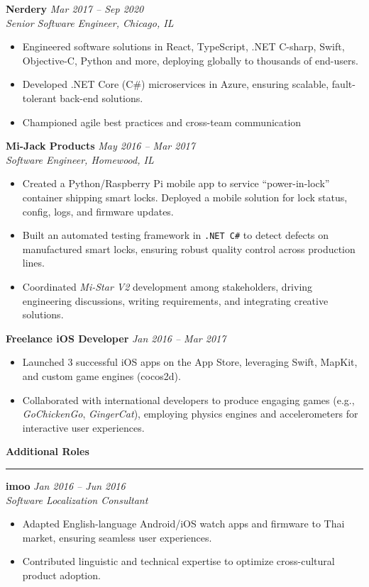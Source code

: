 \documentclass[letterpaper,10pt]{article}
\newcommand{\resheading}[1]{
  \vspace{10pt}
  \textbf{\large #1}
  \vspace{5pt}
  \hrule
  \vspace{5pt}
}
\begin{document}
\textbf{Nerdery} \hfill \textit{Mar 2017 -- Sep 2020}\\
\emph{Senior Software Engineer, Chicago, IL}\\
\begin{itemize}
  \item Engineered software solutions in React, TypeScript, .NET C-sharp, Swift, Objective-C, Python and more, 
        deploying globally to thousands of end-users.
  \item Developed .NET Core (C\#) microservices in Azure, ensuring 
        scalable, fault-tolerant back-end solutions.
  \item Championed agile best practices and cross-team communication
\end{itemize}

\textbf{Mi-Jack Products} \hfill \textit{May 2016 -- Mar 2017}\\
\emph{Software Engineer, Homewood, IL}\\
\begin{itemize}
  \item Created a Python/Raspberry Pi mobile app to service “power-in-lock” 
        container shipping smart locks. Deployed a mobile 
        solution for lock status, config, logs, and firmware updates.
  \item Built an automated testing framework in \texttt{.NET C\#} to detect 
        defects on manufactured smart locks, ensuring robust quality 
        control across production lines.
  \item Coordinated \emph{Mi-Star V2} development among stakeholders, 
        driving engineering discussions, writing requirements, 
        and integrating creative solutions.
\end{itemize}

\textbf{Freelance iOS Developer} \hfill \textit{Jan 2016 -- Mar 2017}\\
\begin{itemize}
  \item Launched 3 successful iOS apps on the App Store, leveraging Swift, 
        MapKit, and custom game engines (cocos2d).
  \item Collaborated with international developers to produce engaging 
        games (e.g., \emph{GoChickenGo}, \emph{GingerCat}), employing 
        physics engines and accelerometers for interactive user experiences.
\end{itemize}

\resheading{Additional Roles}
\textbf{imoo} \hfill \textit{Jan 2016 -- Jun 2016}\\
\emph{Software Localization Consultant}\\
\begin{itemize}
  \item Adapted English-language Android/iOS watch apps and firmware to Thai market, 
        ensuring seamless user experiences.
  \item Contributed linguistic and technical expertise to optimize 
        cross-cultural product adoption.
\end{itemize}
\end{document}
